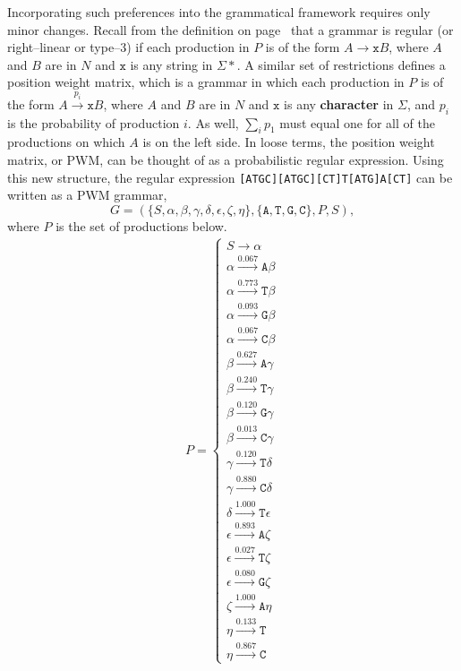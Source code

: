     Incorporating such preferences into the grammatical framework
    requires only minor changes.  Recall from the definition on
    page~\pageref{gramDefs} that a grammar is
    regular (or right--linear or type--3) if each production in $P$ is of the form
    $A\rightarrow \texttt{x}B$, where $A$ and $B$ are in  $N$
    and $\texttt{x}$ is any string in $\Sigma*$.  A similar set
    of restrictions defines a position weight matrix, which is
    a grammar in which each production in $P$ is of the form
    $A\xrightarrow{p_i} \texttt{x}B$, where $A$ and $B$ are in  $N$
    and $\texttt{x}$ is any \textbf{character} in $\Sigma$,
    and $p_i$ is the probability of production $i$.  As well,
    $\sum_i p_1$ must equal one for all of the productions on which
    $A$ is on the left side.  In loose terms, the position weight
    matrix, or PWM, can be thought of as a probabilistic regular
    expression.  Using this new structure, the regular expression
    \texttt{[ATGC][ATGC][CT]T[ATG]A[CT]} can be written as a PWM
    grammar,
\begin{equation}\label{eqn:pwmGrammar}
    G = (\{S, \alpha, \beta, \gamma, \delta, \epsilon, \zeta, \eta\},\{\texttt{A}, \texttt{T},\texttt{G},\texttt{C}\},P,S),
\end{equation}
where $P$ is the set of productions below.
\begin{align}\label{eqn:pwmProduction}
    P =
    \begin{cases}
    S \rightarrow \alpha \\
    \alpha \xrightarrow{0.067} \texttt{A}\beta \\
    \alpha \xrightarrow{0.773} \texttt{T}\beta \\
    \alpha \xrightarrow{0.093} \texttt{G}\beta \\
    \alpha \xrightarrow{0.067} \texttt{C}\beta \\
    \beta \xrightarrow{0.627} \texttt{A}\gamma \\
    \beta \xrightarrow{0.240} \texttt{T}\gamma \\
    \beta \xrightarrow{0.120} \texttt{G}\gamma \\
    \beta \xrightarrow{0.013} \texttt{C}\gamma \\
    \gamma \xrightarrow{0.120} \texttt{T}\delta \\
    \gamma \xrightarrow{0.880} \texttt{C}\delta \\
    \delta \xrightarrow{1.000} \texttt{T}\epsilon \\
    \epsilon \xrightarrow{0.893} \texttt{A}\zeta \\
    \epsilon \xrightarrow{0.027} \texttt{T}\zeta \\
    \epsilon \xrightarrow{0.080} \texttt{G}\zeta \\
    \zeta \xrightarrow{1.000} \texttt{A}\eta \\
    \eta \xrightarrow{0.133} \texttt{T} \\
    \eta \xrightarrow{0.867} \texttt{C}
    \end{cases}
\end{align}
